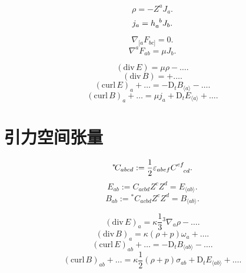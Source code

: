 \begin{equation}
    \rho=-Z^aJ_a.
\end{equation}
\begin{equation}
    j_a=h_a^{\ph{a}b}J_{b}.
\end{equation}

\begin{equation}
    \nabla_{[a}F_{bc]}=0.
\end{equation}
\begin{equation}
    \nabla^{a}F_{ab}=\mu J_{b}.
\end{equation}

\begin{equation}
    (\text{div}\,E)=\mu\rho-\dots.
\end{equation}
\begin{equation}
    (\text{div}\,B)=+\dots.
\end{equation}
\begin{equation}
    (\text{curl}\,E)_a+\dots=-\text{D}_t B_{\langle a\rangle}-\dots.
\end{equation}
\begin{equation}
    (\text{curl}\,B)_a+\dots=\mu j_a+\text{D}_t E_{\langle a\rangle}+\dots.
\end{equation}

\section{引力空间张量}

\begin{equation}
    {}^*\!C_{abcd}:=\frac{1}{2}\varepsilon_{abef}C^{ef}_{\ph{ef}cd}.
\end{equation}
\begin{equation}
    E_{ab}:=C_{acbd}Z^cZ^d=E_{\langle ab\rangle}.
\end{equation}
\begin{equation}
    B_{ab}:={}^*\!C_{acbd}Z^cZ^d=B_{\langle ab\rangle}.
\end{equation}

\begin{equation}
    (\text{div}\,E)_a=\kappa\frac{1}{3}{}^3\nabla_a\rho-\dots.
\end{equation}
\begin{equation}
    (\text{div}\,B)_a=\kappa(\rho+p)\omega_a+\dots.
\end{equation}
\begin{equation}
    (\text{curl}\,E)_{ab}+\dots=-\text{D}_t B_{\langle ab\rangle}-\dots.
\end{equation}
\begin{equation}
    (\text{curl}\,B)_{ab}+\dots=\kappa\frac{1}{2}(\rho+p)\sigma_{ab}+\text{D}_t E_{\langle ab\rangle}+\dots.
\end{equation}

